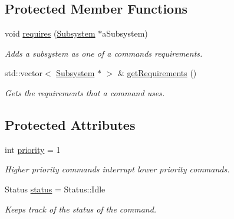 \subsection*{Protected Member Functions}
\begin{DoxyCompactItemize}
\item 
void \mbox{\hyperlink{classlib_iterative_robot_1_1_command_ad7b7f328974f5f17a2a4b1593b6c9eb5}{requires}} (\mbox{\hyperlink{classlib_iterative_robot_1_1_subsystem}{Subsystem}} $\ast$a\+Subsystem)
\begin{DoxyCompactList}\small\item\em Adds a subsystem as one of a command\textquotesingle{}s requirements. \end{DoxyCompactList}\item 
std\+::vector$<$ \mbox{\hyperlink{classlib_iterative_robot_1_1_subsystem}{Subsystem}} $\ast$ $>$ \& \mbox{\hyperlink{classlib_iterative_robot_1_1_command_a447ba6e394f165c6d358471a8bbdc76a}{get\+Requirements}} ()
\begin{DoxyCompactList}\small\item\em Gets the requirements that a command uses. \end{DoxyCompactList}\end{DoxyCompactItemize}
\subsection*{Protected Attributes}
\begin{DoxyCompactItemize}
\item 
\mbox{\label{classlib_iterative_robot_1_1_command_af2fd312376da33f5eba582db90389511}} 
int \mbox{\hyperlink{classlib_iterative_robot_1_1_command_af2fd312376da33f5eba582db90389511}{priority}} = 1
\begin{DoxyCompactList}\small\item\em Higher priority commands interrupt lower priority commands. \end{DoxyCompactList}\item 
\mbox{\label{classlib_iterative_robot_1_1_command_a54548a957a6b4097837c41fcc660467e}} 
Status \mbox{\hyperlink{classlib_iterative_robot_1_1_command_a54548a957a6b4097837c41fcc660467e}{status}} = Status\+::\+Idle
\begin{DoxyCompactList}\small\item\em Keeps track of the status of the command. \end{DoxyCompactList}\end{DoxyCompactItemize}
